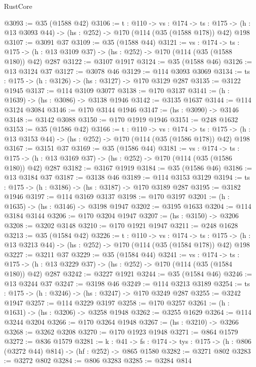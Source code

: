 \begin{lexlean}{RustCore}
\begin{coremodule}
@3093 := @35 (@1588 @42)
@3106 := {t : @110} ->
  {vs : @174} ->
  {ts : @175} -> (h : @13 @3093 @44) -> (hs : @252) -> @170 (@114 (@35 (@1588 @178)) @42) @198
@3107 := @3091 @37
@3109 := @35 (@1588 @44)
@3121 := {vs : @174} ->
  {ts : @175} -> (h : @13 @3109 @37) -> (hs : @252) -> @170 (@114 (@35 (@1588 @180)) @42) @287
@3122 := @3107 @1917
@3124 := @35 (@1588 @46)
@3126 := @13 @3124 @37
@3127 := @3078 @46
@3129 := @114 @3093 @3069
@3134 := {ts : @175} -> (h : @3126) -> (hs : @3127) -> @170 @3129 @287
@3135 := @3122 @1945
@3137 := @114 @3109 @3077
@3138 := @170 @3137
@3141 := (h : @1639) -> (hs : @3086) -> @3138 @1946
@3142 := @3135 @1637
@3144 := @114 @3124 @3084
@3146 := @170 @3144 @1946
@3147 := (hs : @3090) -> @3146
@3148 := @3142 @3088
@3150 := @170 @1919 @1946
@3151 := @248 @1632
@3153 := @35 (@1586 @42)
@3166 := {t : @110} ->
  {vs : @174} ->
  {ts : @175} -> (h : @13 @3153 @44) -> (hs : @252) -> @170 (@114 (@35 (@1586 @178)) @42) @198
@3167 := @3151 @37
@3169 := @35 (@1586 @44)
@3181 := {vs : @174} ->
  {ts : @175} -> (h : @13 @3169 @37) -> (hs : @252) -> @170 (@114 (@35 (@1586 @180)) @42) @287
@3182 := @3167 @1919
@3184 := @35 (@1586 @46)
@3186 := @13 @3184 @37
@3187 := @3138 @46
@3189 := @114 @3153 @3129
@3194 := {ts : @175} -> (h : @3186) -> (hs : @3187) -> @170 @3189 @287
@3195 := @3182 @1946
@3197 := @114 @3169 @3137
@3198 := @170 @3197
@3201 := (h : @1635) -> (hs : @3146) -> @3198 @1947
@3202 := @3195 @1633
@3204 := @114 @3184 @3144
@3206 := @170 @3204 @1947
@3207 := (hs : @3150) -> @3206
@3208 := @3202 @3148
@3210 := @170 @1921 @1947
@3211 := @248 @1628
@3213 := @35 (@1584 @42)
@3226 := {t : @110} ->
  {vs : @174} ->
  {ts : @175} -> (h : @13 @3213 @44) -> (hs : @252) -> @170 (@114 (@35 (@1584 @178)) @42) @198
@3227 := @3211 @37
@3229 := @35 (@1584 @44)
@3241 := {vs : @174} ->
  {ts : @175} -> (h : @13 @3229 @37) -> (hs : @252) -> @170 (@114 (@35 (@1584 @180)) @42) @287
@3242 := @3227 @1921
@3244 := @35 (@1584 @46)
@3246 := @13 @3244 @37
@3247 := @3198 @46
@3249 := @114 @3213 @3189
@3254 := {ts : @175} -> (h : @3246) -> (hs : @3247) -> @170 @3249 @287
@3255 := @3242 @1947
@3257 := @114 @3229 @3197
@3258 := @170 @3257
@3261 := (h : @1631) -> (hs : @3206) -> @3258 @1948
@3262 := @3255 @1629
@3264 := @114 @3244 @3204
@3266 := @170 @3264 @1948
@3267 := (hs : @3210) -> @3266
@3268 := @3262 @3208
@3270 := @170 @1923 @1948
@3271 := @864 @1579
@3272 := @836 @1579
@3281 := {k : @41} ->
  {fs : @174} -> {tys : @175} -> (h : @806 (@3272 @44) @814) -> (hf : @252) -> @865 @1580
@3282 := @3271 @802
@3283 := @3272 @802
@3284 := @806 @3283
@3285 := @3284 @814

\end{coremodule}
\end{lexlean}
